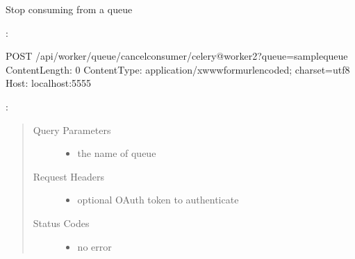 \documentclass[letterpaper,10pt,english]{sphinxmanual}
\begin{document}
\begin{fulllineitems}
\label{\detokenize{api:post--api-worker-queue-cancel-consumer-(.+)}}
Stop consuming from a queue

:

\begin{sphinxVerbatim}[commandchars=\\\{\}]
POST /api/worker/queue/cancel\PYGZhy{}consumer/celery@worker2?queue=sample\PYGZhy{}queue
Content\PYGZhy{}Length: 0
Content\PYGZhy{}Type: application/x\PYGZhy{}www\PYGZhy{}form\PYGZhy{}urlencoded; charset=utf\PYGZhy{}8
Host: localhost:5555
\end{sphinxVerbatim}

:

\begin{sphinxVerbatim}[commandchars=\\\{\}]
  
 
 

     
\end{sphinxVerbatim}
\begin{quote}\begin{description}
\item[{Query Parameters}] \leavevmode\begin{itemize}
\item {} 
 \textendash{} the name of queue

\end{itemize}

\item[{Request Headers}] \leavevmode\begin{itemize}
\item {} 
 \textendash{} optional OAuth token to authenticate

\end{itemize}

\item[{Status Codes}] \leavevmode\begin{itemize}
\item {} 
 \textendash{} no error


\end{itemize}
\end{description}
\end{quote}
\end{fulllineitems}
\end{document}
